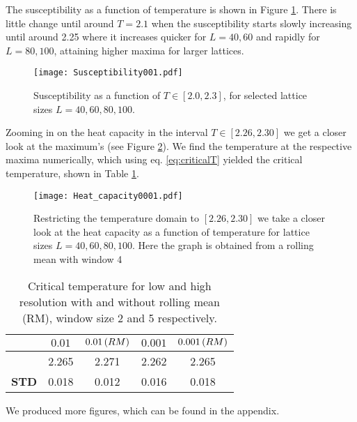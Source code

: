 The susceptibility as a function of temperature is shown in Figure \ref{fig:susceptibility001}. There is little change until around $T=2.1$ when the susceptibility starts slowly increasing until around 2.25 where it increases quicker for $L=40, 60$ and rapidly for $L=80, 100$, attaining higher maxima for larger lattices.
\begin{figure}[htbp]
	\centering
	\texttt{[image: Susceptibility001.pdf]}
	\caption{Susceptibility as a function of $T \in[2.0, 2.3]$, for selected lattice sizes $L = 40, 60, 80, 100$.}
	\label{fig:susceptibility001}
\end{figure}

Zooming in on the heat capacity in the interval $T \in [2.26, 2.30]$ we get a closer look at the maximum's (see Figure \ref{fig:heatcap}). We find the temperature at the respective maxima numerically, which using eq. \ref{eq:criticalT} yielded the critical temperature, shown in Table \ref{table:Tmax}.
\begin{figure}[htbp]
	\centering
	\texttt{[image: Heat\_capacity0001.pdf]}
	\caption{Restricting the temperature domain to $[2.26, 2.30]$ we take a closer look at the heat capacity as a function of temperature for lattice sizes $L=40, 60, 80, 100$. Here the graph is obtained from a rolling mean with window 4}
	\label{fig:heatcap}
\end{figure}

\begin{table}[htbp]
	\centering
	\begin{tabular}{l|cccc}
		\bm{$dT$} & $0.01$ & $0.01 \,\qty(RM)$ & $0.001$ & $0.001 \, \qty(RM)$  \\
		\midrule

		\bm{$T_C$} & 2.265 & 2.271 & 2.262 & 2.265 \\
		\textbf{STD} & 0.018 & 0.012 & 0.016 & 0.018 \\
	\end{tabular}
	\caption{Critical temperature for low and high resolution with and without rolling mean (RM), window size 2 and 5 respectively.}
	\label{table:Tmax}
\end{table}

We produced more figures, which can be found in the appendix.
